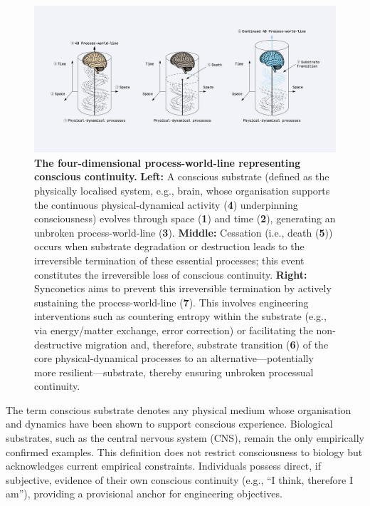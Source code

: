 \documentclass[10pt]{article}
\begin{document}
\begin{sloppypar}
  \begin{figure}[ht!]
    \centering
    \includegraphics[width=\textwidth]{figures/4D-process-world-line-ending.png}
    \caption[The four-dimensional process-world-line representing conscious continuity]{\textbf{The four-dimensional process-world-line representing conscious continuity.} \textbf{Left:} A conscious substrate (defined as the physically localised system, e.g., brain, whose organisation supports the continuous physical-dynamical activity (\textbf{4}) underpinning consciousness) evolves through space (\textbf{1}) and time (\textbf{2}), generating an unbroken process-world-line (\textbf{3}). \textbf{Middle:} Cessation (i.e., death (\textbf{5})) occurs when substrate degradation or destruction leads to the irreversible termination of these essential processes; this event constitutes the irreversible loss of conscious continuity. \textbf{Right:} Synconetics aims to prevent this irreversible termination by actively sustaining the process-world-line (\textbf{7}). This involves engineering interventions such as countering entropy within the substrate (e.g., via energy/matter exchange, error correction) or facilitating the non-destructive migration and, therefore, substrate transition (\textbf{6}) of the core physical-dynamical processes to an alternative—potentially more resilient—substrate, thereby ensuring unbroken processual continuity.}
    \label{fig:process-world-line-ending}
  \end{figure}

  The term conscious substrate denotes any physical medium whose organisation and dynamics have been shown to support conscious experience. Biological substrates, such as the central nervous system (CNS), remain the only empirically confirmed examples. This definition does not restrict consciousness to biology but acknowledges current empirical constraints. Individuals possess direct, if subjective, evidence of their own conscious continuity (e.g., “I think, therefore I am”), providing a provisional anchor for engineering objectives.


\end{sloppypar}
\end{document}
